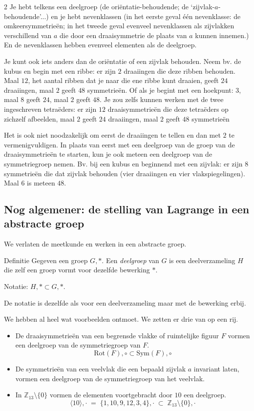\begin{multicols}{2}
Je hebt telkens een deelgroep (de oriëntatie-behoudende; de `zijvlak-$a$-behoudende'...) en je hebt nevenklassen (in het eerste geval één nevenklasse: de omkeersymmetrieën; in het tweede geval evenveel nevenklassen als zijvlakken verschillend van $a$ die door een draaisymmetrie de plaats van $a$ kunnen innemen.) En de nevenklassen hebben evenveel elementen als de deelgroep.

Je kunt ook iets anders dan de oriëntatie of een zijvlak behouden. Neem bv. de kubus en begin met een ribbe: er zijn $2$ draaiingen die deze ribben behouden. Maal $12$, het aantal ribben dat je naar die ene ribbe kunt draaien, geeft $24$ draaiingen, maal $2$ geeft $48$ symmetrieën. Of als je begint met een hoekpunt: $3$, maal $8$ geeft $24$, maal $2$ geeft $48$. Je zou zelfs kunnen werken met de twee ingeschreven tetraëders: er zijn $12$ draaisymmetrieën die deze tetraëders op zichzelf afbeelden, maal $2$ geeft $24$ draaiingen, maal $2$ geeft $48$ symmetrieën

Het is ook niet noodzakelijk om eerst de draaiingen te tellen en dan met $2$ te vermenigvuldigen. In plaats van eerst met een deelgroep van de groep van de draaisymmetrieën te starten, kun je ook meteen een deelgroep van de symmetriegroep nemen. Bv. bij een kubus en beginnend met een zijvlak: er zijn $8$ symmetrieën die dat zijvlak behouden (vier draaiingen en vier vlakspiegelingen). Maal $6$ is meteen $48$.

\subsection{Nog algemener: de stelling van Lagrange in een abstracte groep}

We verlaten de meetkunde en werken in een abstracte groep.

\begin{kader}{Definitie}{}
    Gegeven een groep $G,*$.
    Een \emph{deelgroep} van $G$ is een deelverzameling $H$ die zelf een groep vormt voor dezelfde bewerking $*$.\par Notatie: $H, * \subset G, *$.
\end{kader}

De notatie is dezelfde als voor een deelverzameling maar met de bewerking erbij.

We hebben al heel wat voorbeelden ontmoet. We zetten er drie van op een rij. 

\begin{itemize}
    \item De draaisymmetrieën van een begrensde vlakke of ruimtelijke figuur $F$ vormen een deelgroep van de symmetriegroep van $F$.
    $$\text{Rot}(F), \circ \subset \text{Sym}(F),\circ $$
    \item De symmetrieën van een veelvlak die een bepaald zijvlak $a$  invariant laten, vormen een deelgroep van de symmetriegroep van het veelvlak.
    \item In $\mathbb{Z}_{13}\setminus\{0\}$ vormen de elementen voortgebracht door $10$  een deelgroep.
    $$\langle10\rangle,\cdot \;=\;\{1, 10, 9, 12, 3, 4\},\cdot\;\subset\; \mathbb{Z}_{13}\setminus\{0\}, \cdot$$
\end{itemize} 



\end{multicols}
